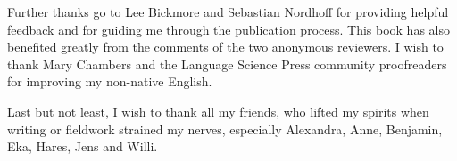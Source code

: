 Further thanks go to Lee Bickmore and Sebastian Nordhoff for providing helpful feedback and for guiding me through the publication process. This book has also benefited greatly from the comments of the two anonymous reviewers. I wish to thank Mary Chambers and the Language Science Press community proofreaders for improving my non-native English.

Last but not least, I wish to thank all my friends, who lifted my spirits when writing or fieldwork strained my nerves, especially Alexandra, Anne, Benjamin, Eka, Hares, Jens and Willi.


